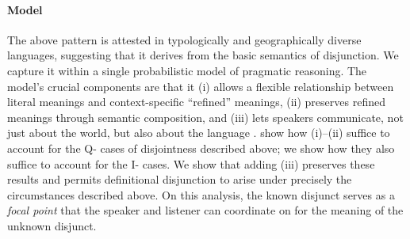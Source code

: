 \documentclass[12pt]{article}
\newcommand{\tech}[1]{\emph{#1}}
\begin{document}
\paragraph{Model} The above pattern is attested in typologically and
geographically diverse languages, suggesting that it derives from the
basic semantics of disjunction. We capture it within a single
probabilistic model of pragmatic reasoning. The model's crucial
components are that it (i) allows a flexible relationship between
literal meanings and context-specific ``refined'' meanings, (ii)
preserves refined meanings through semantic composition, and (iii)
lets speakers communicate, not just about the world, but also about
the language \citep{Smith:Goodman:Frank:2013}.
\citet{bergen-levy-goodman:2014} show how (i)--(ii) suffice to account
for the Q- cases of disjointness described above; we show how they
also suffice to account for the I- cases.  We show that adding (iii)
preserves these results and permits definitional disjunction to arise
under precisely the circumstances described above. On this analysis,
the known disjunct serves as a \tech{focal point} that the speaker and
listener can coordinate on for the meaning of the unknown disjunct.


\let\olditem\item
\renewenvironment{thebibliography}[1]{\footnotesize
  \paragraph{References}
  \let\par\relax\let\newblock\relax
  \renewcommand{\item}[1][]{\olditem[\textbullet]}%
  \inparaenum}{\endinparaenum}



\end{document}
